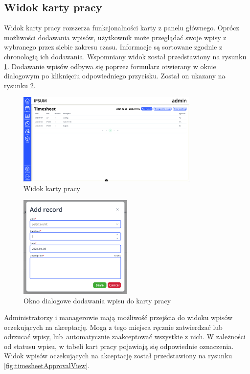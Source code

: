 \subsection{Widok karty pracy}

Widok karty pracy rozszerza funkcjonalności karty z panelu głównego. Oprócz możliwości dodawania wpisów, użytkownik może przeglądać swoje wpisy z wybranego przez siebie zakresu czasu. Informacje są sortowane zgodnie z chronologią ich dodawania. Wspomniany widok został przedstawiony na rysunku \ref{fig:timesheetView}. Dodawanie wpisów odbywa się poprzez formularz otwierany w oknie dialogowym po kliknięciu odpowiedniego przycisku. Został on ukazany na rysunku \ref{fig:timesheetDialog}.

\begin{figure}[H]
    \centering
    \includegraphics[width=0.8\textwidth, frame]{graf/front/timesheet.png}
    \caption{Widok karty pracy}
    \label{fig:timesheetView}
\end{figure}

\begin{figure}[H]
    \centering
    \includegraphics[width=0.5\textwidth]{graf/front/timesheetAddRecord.png}
    \caption{Okno dialogowe dodawania wpisu do karty pracy}
    \label{fig:timesheetDialog}
\end{figure}

Administratorzy i managerowie mają możliwość przejścia do widoku wpisów oczekujących na akceptację. Mogą z tego miejsca ręcznie zatwierdzać lub odrzucać wpisy, lub~automatycznie zaakceptować wszystkie z nich. W zależności od statusu wpisu, w tabeli kart pracy pojawiają się odpowiednie oznaczenia. Widok wpisów oczekujących na akceptację został przedstawiony na rysunku \ref{fig:timesheetApprovalView}.


